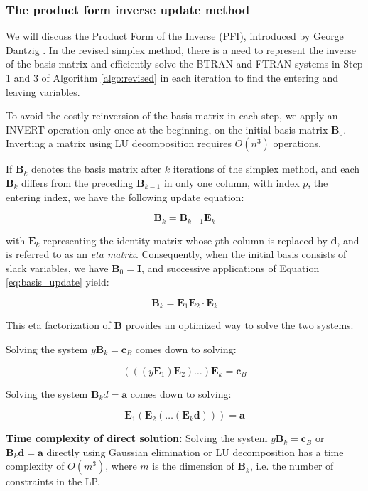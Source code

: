 \subsubsection{The product form inverse update method}

We will discuss the Product Form of the Inverse (PFI), introduced by
George Dantzig \parencite{dantzig1954product}. In the revised simplex method,
there is a need to represent the inverse of the basis matrix and efficiently
solve the BTRAN and FTRAN systems in Step 1 and 3 of Algorithm \ref{algo:revised}
in each iteration to find the entering and leaving variables.

To avoid the costly reinversion of the basis matrix in each step,
we apply an INVERT operation only once at the beginning, on the initial basis
matrix \(\mathbf{B}_0\). Inverting a matrix using LU decomposition requires \(O(n^3)\)
operations.

If \(\mathbf{B}_k\) denotes the basis matrix after \(k\)
iterations of the simplex method, and each \(\mathbf{B}_k\) differs from the
preceding \(\mathbf{B}_{k-1}\) in only one column, with index $p$, the entering index,
we have the following update equation:

\[
    \mathbf{B}_k = \mathbf{B}_{k-1}\mathbf{E}_k \label{eq:basis_update}
\]

with \(\mathbf{E}_k\) representing the identity matrix whose \(p\)th column
is replaced by \(\mathbf{d}\), and is referred to as an \textit{eta matrix}.
Consequently, when the initial basis consists of slack variables,
we have \(\mathbf{B}_0 = \mathbf{I}\), and successive applications of
Equation \ref{eq:basis_update} yield:

\[
    \mathbf{B}_k = \mathbf{E}_1\mathbf{E}_2 \cdot \mathbf{E}_k \label{eq:eta_factorization}
\]

This eta factorization of \(\mathbf{B}\) provides an optimized way
to solve the two systems.

Solving the system \(y\mathbf{B}_k = \mathbf{c}_B\) comes down to solving:

\[
    (((y\mathbf{E}_1)\mathbf{E}_2) \ldots )\mathbf{E}_{k} = \mathbf{c}_B
\]

Solving the system \(\mathbf{B}_kd = \mathbf{a}\) comes down to solving:

\[
    \mathbf{E}_1(\mathbf{E}_2( \ldots (\mathbf{E}_{k}\mathbf{d}))) = \mathbf{a}
\]

\textbf{Time complexity of direct solution:}
Solving the system \(y\mathbf{B}_k = \mathbf{c}_B\) or \(\mathbf{B}_k\mathbf{d} = \mathbf{a}\) directly using
Gaussian elimination or LU decomposition has a time complexity of \(O(m^3)\),
where \(m\) is the dimension of \(\mathbf{B}_k\), i.e. the number of constraints in the LP.


